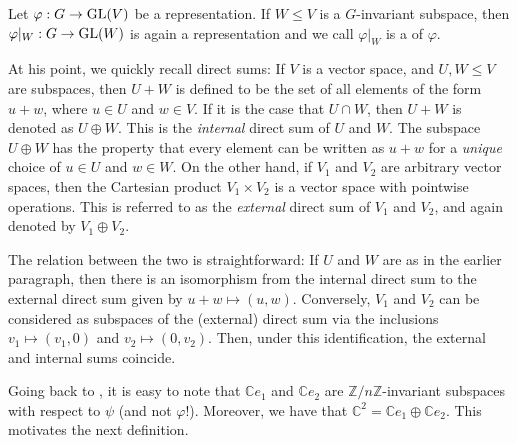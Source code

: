 \begin{defn}%
	Let $\varphi:G\to \operatorname{GL}(V)$ be a representation. If $W \le V$ is a $G$-invariant subspace, then $\varphi|_W : G \to \operatorname{GL}(W)$ is again a representation and we call $\varphi|_W$ is a  of $\varphi.$
\end{defn}

At his point, we quickly recall direct sums: If $V$ is a vector space, and $U, W \le V$ are subspaces, then $U + W$ is defined to be the set of all elements of the form $u + w$, where $u \in U$ and $w \in V$. If it is the case that $U \cap W$, then $U + W$ is denoted as $U \oplus W$. This is the \emph{internal} direct sum of $U$ and $W$. The subspace $U \oplus W$ has the property that every element can be written as $u + w$ for a \emph{unique} choice of $u \in U$ and $w \in W$. \newline
On the other hand, if $V_{1}$ and $V_{2}$ are arbitrary vector spaces, then the Cartesian product $V_{1} \times V_{2}$ is a vector space with pointwise operations. This is referred to as the \emph{external} direct sum of $V_{1}$ and $V_{2}$, and again denoted by $V_{1} \oplus V_{2}$. 

The relation between the two is straightforward: If $U$ and $W$ are as in the earlier paragraph, then there is an isomorphism from the internal direct sum to the external direct sum given by $u + w \mapsto (u, w)$. \newline
Conversely, $V_{1}$ and $V_{2}$ can be considered as subspaces of the (external) direct sum via the inclusions $v_{1} \mapsto (v_{1}, 0)$ and $v_{2} \mapsto (0, v_{2})$. Then, under this identification, the external and internal sums coincide.

Going back to , it is easy to note that $\mathbb{C}e_1$ and $\mathbb{C}e_2$ are $\mathbb{Z}/n\mathbb{Z}$-invariant subspaces with respect to $\psi$ (and not $\varphi$!). Moreover, we have that $\mathbb{C}^2 = \mathbb{C}e_1 \oplus \mathbb{C}e_2.$ This motivates the next definition.

